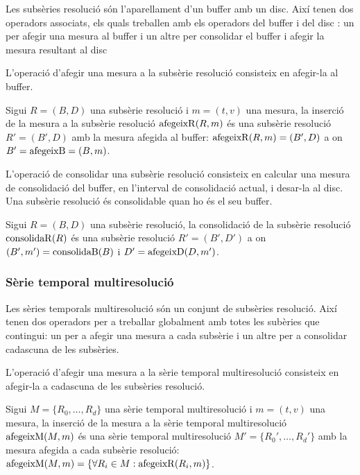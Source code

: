 Les subsèries resolució són l'aparellament d'un buffer amb un disc.
Així tenen dos operadors associats, els quals treballen amb els
operadors del buffer i del disc : un per afegir una mesura al buffer i
un altre per consolidar el buffer i afegir la mesura resultant al disc


L'operació d'afegir una mesura a la subsèrie resolució consisteix en
afegir-la al buffer.
\begin{definition}
  Sigui $R=(B,D)$ una subsèrie resolució i $m=(t,v)$ una mesura, la
  inserció de la mesura a la subsèrie resolució $\operatorname*{afegeixR}(R,m)$ és una
  subsèrie resolució $R'=(B',D)$ amb la mesura afegida al buffer:
  $\operatorname*{afegeixR}(R,m) = (B',D)$ a on $B'=\operatorname*{afegeixB}=(B,m)$.
\end{definition}


L'operació de consolidar una subsèrie resolució consisteix en calcular
una mesura de consolidació del buffer, en l'interval de consolidació
actual, i desar-la al disc. Una subsèrie resolució és consolidable
quan ho és el seu buffer.
\begin{definition}
  Sigui $R=(B,D)$ una subsèrie resolució, la consolidació de la
  subsèrie resolució $\operatorname*{consolidaR}(R)$ és una subsèrie resolució
  $R'=(B',D')$ a on $(B',m') = \operatorname*{consolidaB}(B)$ i $D'=\operatorname*{afegeixD}(D,m')$.
\end{definition}





\subsubsection{Sèrie temporal multiresolució}

Les sèries temporals multiresolució són un conjunt de subsèries
resolució. Així tenen dos operadors per a treballar globalment amb
totes les subèries que contingui: un per a afegir una mesura a cada
subsèrie i un altre per a consolidar cadascuna de les subsèries.


L'operació d'afegir una mesura a la sèrie temporal multiresolució
consisteix en afegir-la a cadascuna de les subsèries resolució.
\begin{definition}
  Sigui $M=\{R_0,\dotsc,R_d\}$ una sèrie temporal multiresolució i
  $m=(t,v)$ una mesura, la inserció de la mesura a la sèrie temporal
  multiresolució $\operatorname*{afegeixM}(M,m)$ és una sèrie temporal multiresolució
  $M'=\{R_0',\dotsc,R_d'\}$ amb la mesura afegida a cada subsèrie
  resolució: $\operatorname*{afegeixM}(M,m) = \{ \forall R_i\in M: \operatorname*{afegeixR}(R_i,m) \}$.
\end{definition}


